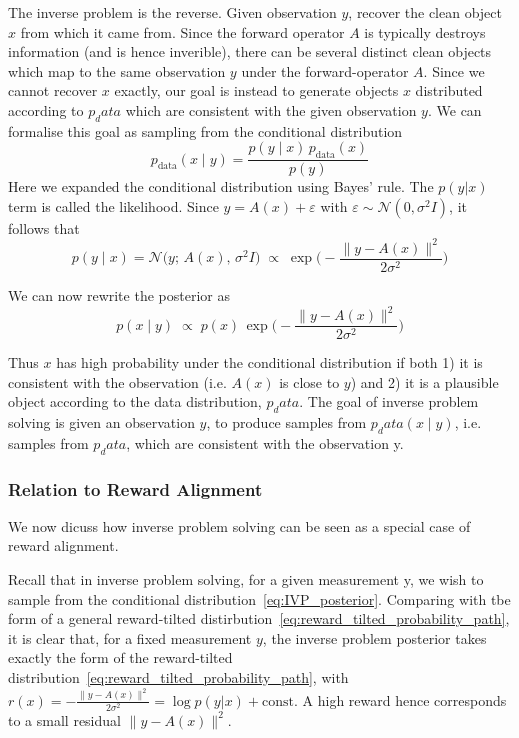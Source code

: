 \documentclass[12pt,a4paper]{report}
\begin{document}
The inverse problem is the reverse.
Given observation $y$, recover the clean object $x$ from which it came from. 
Since the forward operator $A$ is typically destroys information (and is hence inverible), there can be several distinct clean objects which map to the same observation $y$ under the forward-operator $A$.
Since we cannot recover $x$ exactly, our goal is instead to generate objects $x$ distributed according to $p_data$ which are consistent with the given observation $y$. 
We can formalise this goal as sampling from the conditional distribution
\[ p_\text{data}(x \mid y) = \frac{p(y \mid x)\,p_\text{data}(x)}{p(y)} \]
Here we expanded the conditional distribution using Bayes' rule. 
The $p(y | x)$ term is called the likelihood. Since $y = A(x) + \varepsilon$ with $\varepsilon \sim \mathcal{N}(0, \sigma^2 I) $, it follows that 
\[ p(y \mid x) = \mathcal{N}\big(y;\, A(x),\, \sigma^2 I\big) \;\propto\; \exp\!\Big(-\frac{\|y - A(x)\|^2}{2\sigma^2}\Big) \]

We can now rewrite the posterior as
\begin{equation}
  \label{eq:IVP_posterior}
  p(x \mid y)  \;\propto\; p(x)\,\exp\!\Big(-\frac{\|y - A(x)\|^2}{2\sigma^2}\Big)
\end{equation}

Thus $x$ has high probability under the conditional distribution if both 1) it is consistent with the observation (i.e. $A(x)$ is close to $y$) and 2) it is a plausible object according to the data distribution, $p_data$. 
The goal of inverse problem solving is given an observation $y$, to produce samples from $p_data(x \mid y)$, i.e. samples from $p_data$, which are consistent with the observation y. %

\subsubsection{Relation to Reward Alignment}
We now dicuss how inverse problem solving can be seen as a special case of reward alignment. 

Recall that in inverse problem solving, for a given measurement y, we wish to sample from the conditional distribution~\ref{eq:IVP_posterior}. 
Comparing with tbe form of a general reward-tilted distirbution~\ref{eq:reward_tilted_probability_path}, it is clear that, for a fixed measurement $y$, the inverse problem posterior takes exactly the form of the reward-tilted distribution~\ref{eq:reward_tilted_probability_path}, with $r(x) = -\frac{\|y - A(x)\|^2}{2\sigma^2} = \log p(y | x) + \text{const}$. 
A high reward hence corresponds to a small residual $\|y - A(x)\|^2$.
\end{document}
